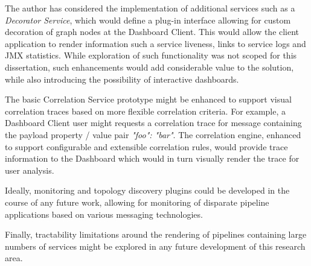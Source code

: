 The author has considered the implementation of additional services such as a \textit{Decorator Service}, which would define a plug-in interface allowing for custom decoration of graph nodes at the Dashboard Client. This would allow the client application to render information such a service liveness, links to service logs and JMX statistics. While exploration of such functionality was not scoped for this dissertation, such enhancements would add considerable value to the solution, while also introducing the possibility of interactive dashboards.

The basic Correlation Service prototype might be enhanced to support visual correlation traces based on more flexible correlation criteria. For example, a Dashboard Client user might requests a correlation trace for message containing the payload property / value pair \textit{"foo": "bar"}. The correlation engine, enhanced to support configurable and extensible correlation rules, would provide trace information to the Dashboard which would in turn visually render the trace for user analysis.

Ideally, monitoring and topology discovery plugins could be developed in the course of any future work, allowing for monitoring of disparate pipeline applications based on various messaging technologies. 

Finally, tractability limitations around the rendering of pipelines containing large numbers of services might be explored in any future development of this research area.